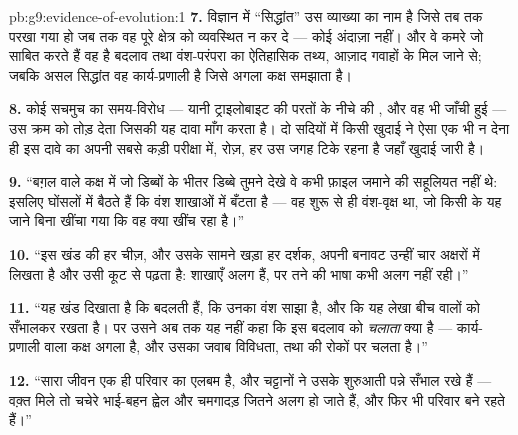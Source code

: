 \begin{solution}{pb:g9:evidence-of-evolution:1}
\textbf{7.} विज्ञान में ``सिद्धांत'' उस व्याख्या का नाम है जिसे तब तक
परखा गया हो जब तक वह पूरे क्षेत्र को व्यवस्थित न कर दे --- कोई अंदाज़ा
नहीं। और वे कमरे जो साबित करते हैं वह है बदलाव तथा वंश-परंपरा का
ऐतिहासिक तथ्य, आज़ाद गवाहों के मिल जाने से; जबकि असल सिद्धांत वह
कार्य-प्रणाली है जिसे अगला कक्ष समझाता है।

\textbf{8.} कोई सचमुच का समय-विरोध --- यानी ट्राइलोबाइट की परतों के नीचे
 की , और वह भी जाँची हुई --- उस क्रम को तोड़ देता जिसकी
यह दावा माँग करता है। दो सदियों में किसी खुदाई ने ऐसा एक भी न देना ही इस
दावे का अपनी सबसे कड़ी परीक्षा में, रोज़, हर उस जगह टिके रहना है जहाँ
खुदाई जारी है।

\textbf{9.} ``बग़ल वाले कक्ष में जो डिब्बों के भीतर डिब्बे तुमने देखे वे
कभी फ़ाइल जमाने की सहूलियत नहीं थे:  इसलिए घोंसलों में बैठते हैं
कि वंश शाखाओं में बँटता है --- वह  शुरू से ही वंश-वृक्ष था, जो
किसी के यह जाने बिना खींचा गया कि वह क्या खींच रहा है।''

\textbf{10.} ``इस खंड की हर चीज़, और उसके सामने खड़ा हर दर्शक, अपनी
बनावट उन्हीं चार अक्षरों में लिखता है और उसी कूट से पढ़ता है: शाखाएँ अलग
हैं, पर तने की भाषा कभी अलग नहीं रही।''

\textbf{11.} ``यह खंड दिखाता है कि  बदलती हैं, कि उनका वंश
साझा है, और कि यह लेखा बीच वालों को सँभालकर रखता है। पर उसने अब तक यह
नहीं कहा कि इस बदलाव को \emph{चलाता} क्या है --- कार्य-प्रणाली वाला कक्ष
अगला है, और उसका जवाब विविधता,  तथा  की रोकों पर चलता
है।''

\textbf{12.} ``सारा जीवन एक ही परिवार का एलबम है, और चट्टानों ने उसके
शुरुआती पन्ने सँभाल रखे हैं --- वक़्त मिले तो चचेरे भाई-बहन ह्वेल और
चमगादड़ जितने अलग हो जाते हैं, और फिर भी परिवार बने रहते हैं।''
\end{solution}
